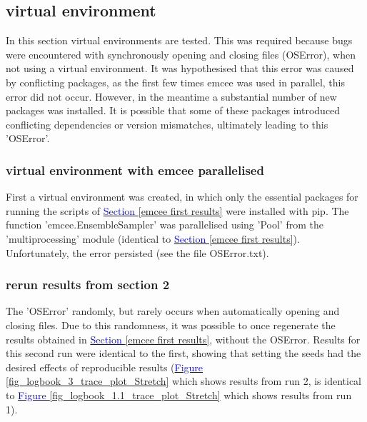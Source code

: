 \subsection{virtual environment}\label{virtual environment}
In this section virtual environments are tested. This was required because bugs were encountered with synchronously opening and closing files (OSError), when not using a virtual environment. It was hypothesised that this error was caused by conflicting packages, as the first few times emcee was used in parallel, this error did not occur. However, in the meantime a substantial number of new packages was installed. It is possible that some of these packages introduced conflicting dependencies or version mismatches, ultimately leading to this 'OSError'.

\subsubsection{virtual environment with emcee parallelised}
First a virtual environment was created, in which only the essential packages for running the scripts of \hyperref[emcee first results]{\textcolor{blue}{Section }\ref{emcee first results}} were installed with pip. The function 'emcee.EnsembleSampler' was parallelised using 'Pool' from the 'multiprocessing' module (identical to \hyperref[emcee first results]{\textcolor{blue}{Section }\ref{emcee first results}}). Unfortunately, the error persisted (see the file OSError.txt). 

\subsubsection{rerun results from section 2}
The 'OSError' randomly, but rarely occurs when automatically opening and closing files. Due to this randomness, it was possible to once regenerate the results obtained in \hyperref[emcee first results]{\textcolor{blue}{Section }\ref{emcee first results}}, without the OSError. Results for this second run were identical to the first, showing that setting the seeds had the desired effects of reproducible results (\hyperref[fig_logbook_3_trace_plot_Stretch]{\textcolor{blue}{Figure }\ref{fig_logbook_3_trace_plot_Stretch}} which shows results from run 2, is identical to \hyperref[fig_logbook_1.1_trace_plot_Stretch]{\textcolor{blue}{Figure }\ref{fig_logbook_1.1_trace_plot_Stretch}} which shows results from run 1).  

